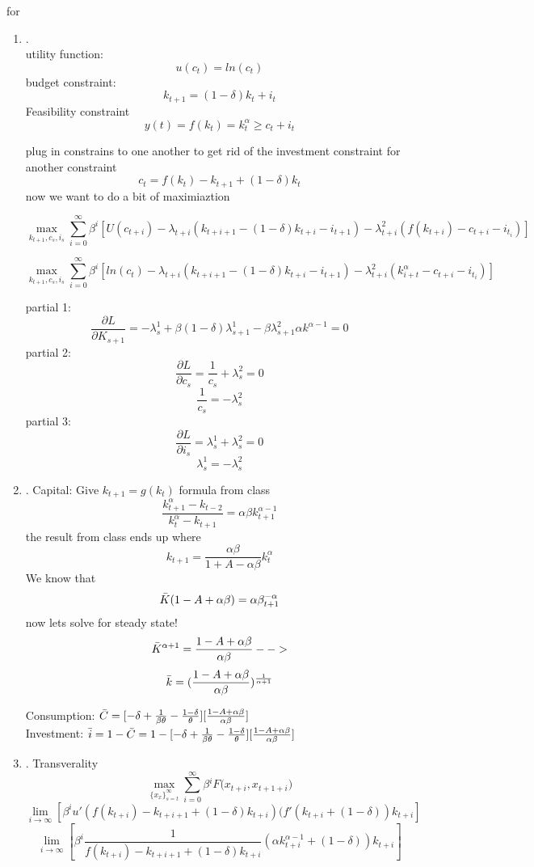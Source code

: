 
for\begin{enumerate}
    \item .\\
    utility function: $$u(c_t)=ln(c_t)$$
    budget constraint:$$k_{t+1}=(1-\delta)k_t+i_t$$ 
    Feasibility constraint $$ y(t)=f(k_t)=k^\alpha _t\geq c_t+i_t$$
    
plug in constrains to one another to get rid of the investment constraint for another constraint
$$c_t=f(k_t)-k_{t+1}+(1-\delta)k_t$$
now we want to do a bit of maximiaztion

$$\max_{k_{t+1},c_s,i_s} \sum^\infty_{i=0}\beta^i[U(c_{t+i})-\lambda_{t+i}(k_{t+i+1}-(1-\delta)k_{t+i}-i_{t+1})-\lambda^2_{t+i}(f(k_{t+i})-c_{t+i}-i_{t_i})]$$

$$\max_{k_{t+1},c_s,i_s} \sum^\infty_{i=0}\beta^i[ln(c_t)-\lambda_{t+i}(k_{t+i+1}-(1-\delta)k_{t+i}-i_{t+1})-\lambda^2_{t+i}(k_{i+t}^\alpha-c_{t+i}-i_{t_i})]$$

partial 1:
$$\frac{\partial L}{\partial K_{s+1}}= -\lambda^1_s+\beta(1-\delta)\lambda^1_{s+1}-\beta\lambda^2_{s+1}\alpha k^{\alpha-1}=0$$
partial 2:
$$\frac{\partial L}{\partial c_s}= \frac{1}{c_s}+\lambda^2_s=0$$
$$\frac{1}{c_s}=-\lambda^2_s$$
partial 3:
$$\frac{\partial L}{\partial i_s}= \lambda^1_s+\lambda^2_s=0$$
$$ \lambda^1_s=-  \lambda^2_s$$

\item .
Capital: Give  $k_{t+1}=g(k_t)$ formula from class
$$\frac{k^\alpha_{t+1}-k_{t-2}}{k^\alpha_{t}-k_{t+1}}=\alpha \beta k^{\alpha-1}_{t+1}$$
the result from class ends up where
$$k_{t+1}=\frac{\alpha \beta}{1+A-\alpha \beta}k^\alpha_t$$
We know that
$$\Bar{K}(1-A+\alpha \beta)=\alpha \beta^{-\alpha}_{t+1}$$
now lets solve for steady state!
$$\Bar{K}^{\alpha +1}=\frac{1-A+\alpha \beta}{\alpha \beta}-->$$ 
$$\Bar{k}=(\frac{1-A+\alpha \beta}{\alpha \beta})^{\frac{1}{\alpha +1}}$$

Consumption: $\Bar{C}=[-\delta+\frac{1}{\beta \theta}-\frac{1-\delta}{\theta}][\frac{1-A+\alpha \beta}{\alpha \beta}]$\\
Investment: $\Bar{i}=1-\Bar{C}=1-[-\delta+\frac{1}{\beta \theta}-\frac{1-\delta}{\theta}][\frac{1-A+\alpha \beta}{\alpha \beta}]$

\item. Transverality 
$$\max_{\{x_x\}^\infty_{s=t}}\sum^\infty_{i=0}\beta{^iF(x_{t+i},x_{t+1+i}})$$
$$\lim_{i \rightarrow \infty}[\beta^i u'(f(k_{t+i})-k_{t+i+1}+(1-\delta)k_{t+i})(f'(k_{t+i}+(1-\delta))k_{t+i}]$$
$$\lim_{i \rightarrow \infty}[\beta^i \frac{1}{f(k_{t+i})-k_{t+i+1}+(1-\delta)k_{t+i}}(\alpha k_{t+i}^{\alpha-1}+(1-\delta))k_{t+i}]$$

\end{enumerate}